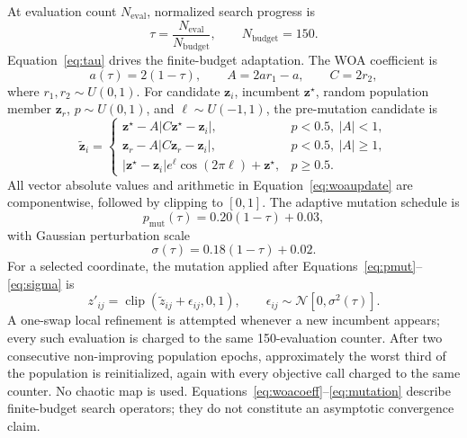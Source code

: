 \documentclass[pdflatex,sn-mathphys-num]{sn-jnl}
\begin{document}
At evaluation count $N_{\mathrm{eval}}$, normalized search progress is
\begin{equation}
\tau=\frac{N_{\mathrm{eval}}}{N_{\mathrm{budget}}},\qquad N_{\mathrm{budget}}=150.
\label{eq:tau}
\end{equation}
Equation~\eqref{eq:tau} drives the finite-budget adaptation. The WOA coefficient is
\begin{equation}
a(\tau)=2(1-\tau),\qquad A=2a r_1-a,\qquad C=2r_2,
\label{eq:woacoeff}
\end{equation}
where $r_1,r_2\sim U(0,1)$. For candidate $\mathbf{z}_i$, incumbent $\mathbf{z}^{\star}$, random population member $\mathbf{z}_r$, $p\sim U(0,1)$, and $\ell\sim U(-1,1)$, the pre-mutation candidate is
\begin{equation}
\widetilde{\mathbf{z}}_i=
\begin{cases}
\mathbf{z}^{\star}-A|C\mathbf{z}^{\star}-\mathbf{z}_i|, & p<0.5,\ |A|<1,\\
\mathbf{z}_r-A|C\mathbf{z}_r-\mathbf{z}_i|, & p<0.5,\ |A|\ge1,\\
|\mathbf{z}^{\star}-\mathbf{z}_i|e^{\ell}\cos(2\pi\ell)+\mathbf{z}^{\star}, & p\ge0.5.
\end{cases}
\label{eq:woaupdate}
\end{equation}
All vector absolute values and arithmetic in Equation~\eqref{eq:woaupdate} are componentwise, followed by clipping to $[0,1]$. The adaptive mutation schedule is
\begin{equation}
p_{\mathrm{mut}}(\tau)=0.20(1-\tau)+0.03,
\label{eq:pmut}
\end{equation}
with Gaussian perturbation scale
\begin{equation}
\sigma(\tau)=0.18(1-\tau)+0.02.
\label{eq:sigma}
\end{equation}
For a selected coordinate, the mutation applied after Equations~\eqref{eq:pmut}--\eqref{eq:sigma} is
\begin{equation}
z'_{ij}=\operatorname{clip}\!\left(\widetilde z_{ij}+\epsilon_{ij},0,1\right),\qquad
\epsilon_{ij}\sim\mathcal{N}[0,\sigma^2(\tau)].
\label{eq:mutation}
\end{equation}
A one-swap local refinement is attempted whenever a new incumbent appears; every such evaluation is charged to the same 150-evaluation counter. After two consecutive non-improving population epochs, approximately the worst third of the population is reinitialized, again with every objective call charged to the same counter. No chaotic map is used. Equations~\eqref{eq:woacoeff}--\eqref{eq:mutation} describe finite-budget search operators; they do not constitute an asymptotic convergence claim.
\end{document}
